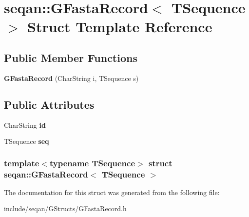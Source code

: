 \hypertarget{structseqan_1_1_g_fasta_record}{\section{seqan\-:\-:\-G\-Fasta\-Record$<$ \-T\-Sequence $>$ \-Struct \-Template \-Reference}
\label{structseqan_1_1_g_fasta_record}
}
\subsection*{\-Public \-Member \-Functions}
\begin{DoxyCompactItemize}
\item 
\hypertarget{structseqan_1_1_g_fasta_record_aab6a24e2129b61ff86d56bc2b6b9e9a3}{{\bfseries \-G\-Fasta\-Record} (\-Char\-String i, \-T\-Sequence s)}\label{structseqan_1_1_g_fasta_record_aab6a24e2129b61ff86d56bc2b6b9e9a3}

\end{DoxyCompactItemize}
\subsection*{\-Public \-Attributes}
\begin{DoxyCompactItemize}
\item 
\hypertarget{structseqan_1_1_g_fasta_record_a9fc0e5fb39002e38b528f34906899941}{\-Char\-String {\bfseries id}}\label{structseqan_1_1_g_fasta_record_a9fc0e5fb39002e38b528f34906899941}

\item 
\hypertarget{structseqan_1_1_g_fasta_record_a55a6d2deb7ef975f28a4aac89c779702}{\-T\-Sequence {\bfseries seq}}\label{structseqan_1_1_g_fasta_record_a55a6d2deb7ef975f28a4aac89c779702}

\end{DoxyCompactItemize}
\subsubsection*{template$<$typename \-T\-Sequence$>$ struct seqan\-::\-G\-Fasta\-Record$<$ T\-Sequence $>$}



\-The documentation for this struct was generated from the following file\-:\begin{DoxyCompactItemize}
\item 
include/seqan/\-G\-Structs/\-G\-Fasta\-Record.\-h\end{DoxyCompactItemize}

